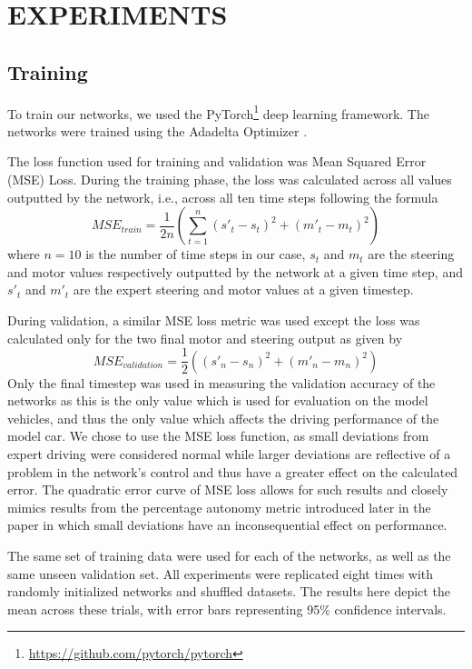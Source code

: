 \addtolength{\textheight}{-10pt}

\section{EXPERIMENTS}
\label{sec:experiments}

\subsection{Training}
To train our networks, we used the PyTorch\footnote{\url{https://github.com/pytorch/pytorch}} deep learning framework. The networks were trained using the Adadelta Optimizer \cite{DBLP:journals/corr/abs-1212-5701}.

The loss function used for training and validation was Mean Squared Error  (MSE) Loss. During the training phase, the loss was calculated across all values outputted by the network, i.e., across all ten time steps following the formula
\begin{equation} \label{eq:1}
MSE_{train} = \dfrac{1}{2n}(\sum_{t=1}^{n}(s'_t -  s_t)^2 +(m'_t - m_t)^2)
\end{equation}
where $n=10$ is the number of time steps in our case, $s_t$  and $m_t$ are the steering and motor values respectively outputted by the network at a given time step, and $s'_t$ and $m'_t$ are the expert steering and motor values at a given timestep.

During validation, a similar MSE loss metric was used except the loss was calculated only for the two final motor and steering output as given by
\begin{equation} \label{eq:2}
MSE_{validation} = \dfrac{1}{2}((s'_n -  s_n)^2 +(m'_n - m_n)^2)
\end{equation}
Only the final timestep was used in measuring the validation accuracy of the networks as this is the only value which is used for evaluation on the model vehicles, and thus the only value which affects the driving performance of the model car. We chose to use the MSE loss function, as small deviations from expert driving were considered normal while larger deviations are reflective of a problem in the network's control and thus have a greater effect on the calculated error. The quadratic error curve of MSE loss allows for such results and closely mimics results from the percentage autonomy metric introduced later in the paper in which small deviations have an inconsequential effect on performance.

The same set of training data were used for each of the networks, as well as the same unseen validation set. All experiments were replicated eight times with randomly initialized networks and shuffled datasets. The results here depict the mean across these trials, with error bars representing 95\% confidence intervals.

